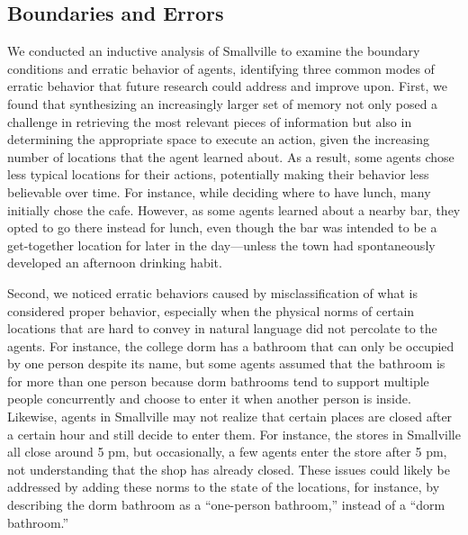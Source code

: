 \subsection{Boundaries and Errors} We conducted an inductive analysis of Smallville to examine the boundary conditions and erratic behavior of agents, identifying three common modes of erratic behavior that future research could address and improve upon. First, we found that synthesizing an increasingly larger set of memory not only posed a challenge in retrieving the most relevant pieces of information but also in determining the appropriate space to execute an action, given the increasing number of locations that the agent learned about. As a result, some agents chose less typical locations for their actions, potentially making their behavior less believable over time. For instance, while deciding where to have lunch, many initially chose the cafe. However, as some agents learned about a nearby bar, they opted to go there instead for lunch, even though the bar was intended to be a get-together location for later in the day---unless the town had spontaneously developed an afternoon drinking habit.

Second, we noticed erratic behaviors caused by misclassification of what is considered proper behavior, especially when the physical norms of certain locations that are hard to convey in natural language did not percolate to the agents. For instance, the college dorm has a bathroom that can only be occupied by one person despite its name, but some agents assumed that the bathroom is for more than one person because dorm bathrooms tend to support multiple people concurrently and choose to enter it when another person is inside. Likewise, agents in Smallville may not realize that certain places are closed after a certain hour and still decide to enter them. For instance, the stores in Smallville all close around 5 pm, but occasionally, a few agents enter the store after 5 pm, not understanding that the shop has already closed. These issues could likely be addressed by adding these norms to the state of the locations, for instance, by describing the dorm bathroom as a ``one-person bathroom,'' instead of a ``dorm bathroom.''

